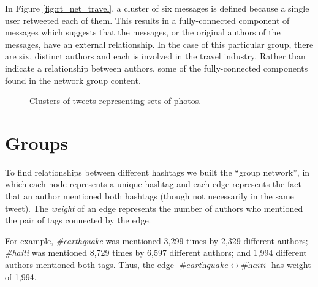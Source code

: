 \documentclass[a4paper, 11pt, titlepage]{article}
\begin{document}
In Figure \ref{fig:rt_net_travel}, a cluster of six messages is defined because a single user retweeted each of them.  This results in a fully-connected component of messages which suggests that the messages, or the original authors of the messages, have an external relationship.  In the case of this particular group, there are six, distinct authors and each is involved in the travel industry.  Rather than indicate a relationship between authors, some of the fully-connected components found in the network group content.

\begin{figure}[h]
\centering
\label{fig:rt_net_photos}
\caption{Clusters of tweets representing sets of photos.}
\end{figure}

\section{Groups}

To find relationships between different hashtags we built the ``group network'', in which each node represents a unique hashtag and each edge represents the fact that an author mentioned both hashtags (though not necessarily in the same tweet). The \textit{weight} of an edge represents the number of authors who mentioned the pair of tags connected by the edge. 

For example, \textit{\#earthquake} was mentioned 3,299 times by 2,329 different authors; \textit{\#haiti} was mentioned 8,729 times by 6,597 different authors; and 1,994 different authors mentioned both tags. Thus, the edge $\textit{\#earthquake}~\leftrightarrow~\textit{\#haiti}$ has weight of 1,994.
\end{document}

